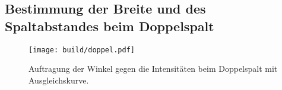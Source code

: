 \subsection{Bestimmung der Breite und des Spaltabstandes beim Doppelspalt}   
    \begin{figure}
        \centering
        \texttt{[image: build/doppel.pdf]}
        \caption{Auftragung der Winkel gegen die Intensitäten beim Doppelspalt mit Ausgleichskurve.}
        \label{fig:doppel}
    \end{figure}